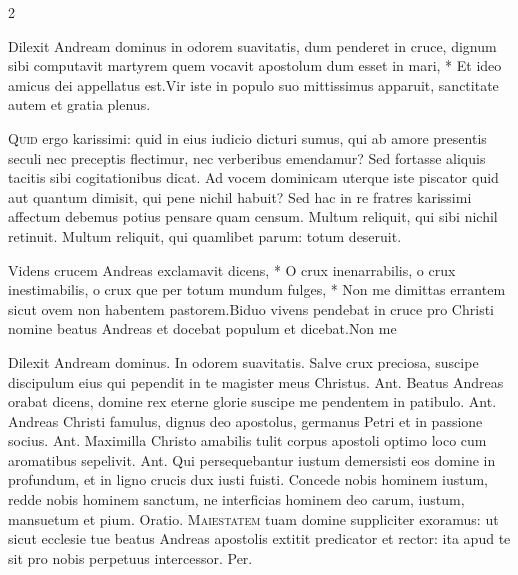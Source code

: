 \begin{multicols*}{2}
\begin{responsory}
{Dilexit Andream dominus in odorem suavitatis, dum penderet in cruce, dignum sibi computavit martyrem quem vocavit apostolum dum esset in mari, * Et ideo amicus dei appellatus est.}{Vir iste in populo suo mittissimus apparuit, sanctitate autem et gratia plenus.}
\end{responsory}%
\lettrine[lines=2]{\zallmancaps \color{Red} Q}{uid} ergo karissimi: quid in eius iudicio dicturi sumus, qui ab amore presentis seculi nec preceptis flectimur, nec verberibus emendamur? Sed fortasse aliquis tacitis sibi cogitationibus dicat. Ad vocem dominicam uterque iste piscator quid aut quantum dimisit, qui pene nichil habuit? Sed hac in re fratres karissimi affectum debemus potius pensare quam censum. Multum reliquit, qui sibi nichil retinuit. Multum reliquit, qui quamlibet parum: totum deseruit.
\begin{responsory-final}
{Videns crucem Andreas exclamavit dicens, * O crux inenarrabilis, o crux inestimabilis, o crux que per totum mundum fulges, * Non me dimittas errantem sicut ovem non habentem pastorem.}{Biduo vivens pendebat in cruce pro Christi nomine beatus Andreas et docebat populum et dicebat.}{Non me}
\end{responsory-final}%
\newline \V Dilexit Andream dominus. \R In odorem suavitatis.
 Salve crux preciosa, suscipe discipulum eius qui pependit in te magister meus Christus. {\color{Red} Ant.} Beatus Andreas orabat dicens, domine rex eterne glorie suscipe me pendentem in patibulo. {\color{Red} Ant.} Andreas Christi famulus, dignus deo apostolus, germanus Petri et in passione socius. {\color{Red} Ant.} Maximilla Christo amabilis tulit corpus apostoli optimo loco cum aromatibus sepelivit. {\color{Red} Ant.} Qui persequebantur iustum demersisti eos domine in profundum, et in ligno crucis dux iusti fuisti.
 Concede nobis hominem iustum, redde nobis hominem sanctum, ne interficias hominem deo carum, iustum, mansuetum et pium. {\color{Red} Oratio.}
\lettrine[lines=2]{\zallmancaps \color{Blue} M}{aiestatem} \hypertarget{maiestatem-andree}{\label{maiestatem-andree}} tuam domine suppliciter exoramus: ut sicut ecclesie tue beatus Andreas apostolis extitit predicator et rector: ita apud te sit pro nobis perpetuus intercessor. Per.

\end{multicols*}
